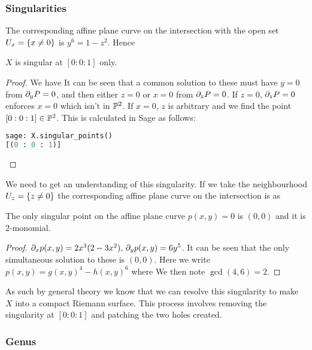 \documentclass{article}
\begin{document}
\subsubsection{Singularities}

The corresponding affine plane curve on the intersection with the open set $U_x = \left\{ x \neq 0 \right\}$ is $y^6 = 1-z^2$. Hence 
\begin{prop}
	$X$ is singular at $[0:0:1]$ only. 
\end{prop}
\begin{proof}
	We have 
It can be seen that a common solution to these must have $y=0$ from $\partial_y P=0$, and then either $z=0$  or $x=0$ from $\partial_zP=0$. If $z=0$, $\partial_zP=0$ enforces $x=0$ which isn't in $\mathbb{P}^2$. If $x=0$, $z$ is arbitrary and we find the point $[0:0:1] \in \mathbb{P}^2$. This is calculated in Sage as follows:
\begin{lstlisting}[language=Python,frame=single]
sage: X.singular_points()
[(0 : 0 : 1)]
\end{lstlisting}
\end{proof}
We need to get an understanding of this singularity. If we take the neighbourhood $U_z = \left\{ z \neq 0 \right\}$ the corresponding affine plane curve on the intersection is 
as 
\begin{prop}
	The only singular point on the affine plane curve $p(x,y)=0$ is $(0,0)$ and it is $2$-monomial. 
\end{prop}
\begin{proof}
	$\partial_x p(x,y) = 2x^3(2-3x^2), \, \partial_y p(x,y) = 6y^5$. It can be seen that the only simultaneous solution to these is  $(0,0)$. Here we write $p(x,y)=g(x,y)^4 - h(x,y)^6$ where
We then note $\gcd(4,6) = 2$. 
\end{proof}
As such by general theory we know that we can resolve this singularity to make $X$ into a compact Riemann surface. This process involves removing the singularity at $[0:0:1]$ and patching the two holes created. 

\subsubsection{Genus}
\end{document}
